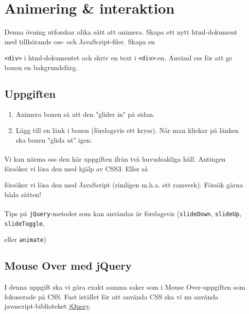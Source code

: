 \documentclass{article}
\begin{document}
\newpage
\section{ Animering \& interaktion }
\paragraph{}
Denna övning utforskar olika sätt att animera. Skapa ett nytt html-dokument med tillhörande css- och JavaScript-filer. Skapa en 

\texttt{<div>} i html-dokumentet och skriv en text i \texttt{<div>}:en. Använd css för att ge boxen en bakgrundsfärg.

\subsection*{Uppgiften}
\begin{enumerate}
	\item Animera boxen så att den "glider in" på sidan.
	\item Lägg till en länk i boxen (förslagsvis ett kryss). När man klickar på länken ska boxen "glida ut" igen.
\end{enumerate}

\paragraph{}
Vi kan närma oss den här uppgiften ifrån två huvudsakliga håll. Antingen försöker vi lösa den med hjälp av CSS3. Eller så 

försöker vi lösa den med JavaScript (rimligen m.h.a. ett ramverk). Försök gärna båda sätten!

\paragraph{}
Tips på \texttt{jQuery}-metoder som kan användas är förslagsvis (\texttt{slideDown}, \texttt{slideUp}, \texttt{slideToggle}, 

eller \texttt{animate})





  \subsection{ Mouse Over med jQuery }
    \paragraph{}
    I denna uppgift ska vi göra exakt samma saker som i Mouse Over-uppgiften som fokuserade på CSS. Fast istället för att använda CSS ska vi nu använda javascript-biblioteket \href{http://jquery.com/download/}{jQuery}.
\end{document}
